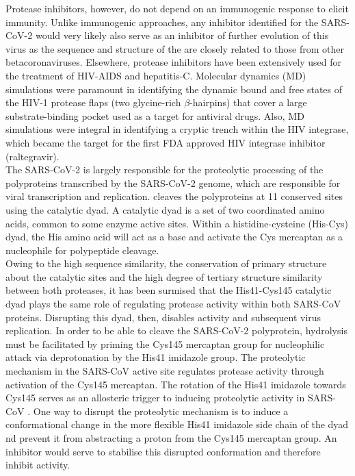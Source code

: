 Protease inhibitors, however, do not depend on an immunogenic response to elicit immunity. Unlike immunogenic approaches, any inhibitor identified for the SARS-CoV-2 \mpro would very likely also serve as an inhibitor of further evolution of this virus as the sequence and structure of the \mpro are closely related to those from other betacoronaviruses.\cite{ullrich2020sars} Elsewhere, protease inhibitors have been extensively used for the treatment of HIV-AIDS\cite{durrant2011molecular,deeks1999hiv} and hepatitis-C\cite{lamarre2003ns3}. Molecular dynamics (MD) simulations were paramount in identifying the dynamic bound and free states of the HIV-1 protease flaps (two glycine-rich $\beta$-hairpins) that cover a large substrate-binding pocket used as a target for antiviral drugs.\cite{york1993molecular} Also, MD simulations were integral in identifying a cryptic trench within the HIV integrase, which became the target for the first FDA approved HIV integrase inhibitor (raltegravir).\cite{schames2004discovery,durrant2011molecular}\\

The SARS-CoV-2 \mpro is largely responsible for the proteolytic processing of the polyproteins transcribed by the SARS-CoV-2 genome, which are responsible for viral transcription and replication. \mpro cleaves the polyproteins at 11 conserved sites using the catalytic dyad.\cite{hegyi2002conservation, jin2020structure} A catalytic dyad is a set of two coordinated amino acids, common to some enzyme active sites. Within a histidine-cysteine (His-Cys) dyad, the His amino acid will act as a base and activate the Cys mercaptan as a nucleophile for polypeptide cleavage. \\

Owing to the high sequence similarity, the conservation of primary structure about the catalytic sites and the high degree of tertiary structure similarity between both proteases, it has been surmised that the His41-Cys145 catalytic dyad plays the same role of regulating protease activity within both SARS-CoV \mpro proteins.\cite{jin2020structure, ullrich2020sars} Disrupting this dyad, then, disables \mpro activity and subsequent virus replication. In order to be able to cleave the SARS-CoV-2 polyprotein, hydrolysis must be facilitated by priming the \mpro Cys145 mercaptan group for nucleophilic attack via deprotonation by the His41 imidazole group. The proteolytic mechanism in the SARS-CoV \mpro active site regulates protease activity through activation of the Cys145 mercaptan. The rotation of the His41 imidazole towards Cys145 serves as an allosteric trigger to inducing proteolytic activity in SARS-CoV \mpro. One way to disrupt the proteolytic mechanism is to induce a conformational change in the more flexible His41 imidazole side chain of the dyad nd prevent it from abstracting a proton from the Cys145 mercaptan group. An inhibitor would serve to stabilise this disrupted conformation and therefore inhibit \mpro activity.\\

